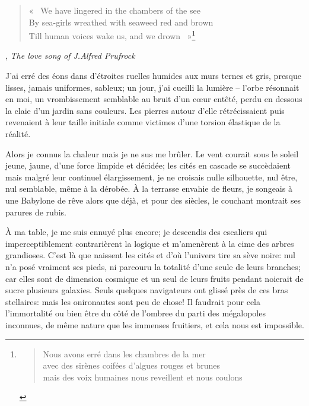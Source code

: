   \begin{quote}
    «~
    We have lingered in the chambers of the see\\
    By sea-girls wreathed with seaweed red and brown\\
    Till human voices wake us, and we drown
    ~»\footnote{
    \begin{verse}
    Nous avons erré dans les chambres de la mer\\
    avec des sirènes coifées d’algues rouges et brunes\\
    mais des voix humaines nous reveillent et nous coulons
  \end{verse}
    }
  \end{quote}
  \begin{flushright}
    , \emph{The love song of J.Alfred Prufrock}
  \end{flushright}

  J’ai erré des éons dans d’étroites  ruelles humides aux murs ternes et
  gris, presque lisses,  jamais uniformes, sableux; un jour,  j’ai cueilli la
  lumière -- l’orbe  résonnait en moi, un vrombissement  semblable au bruit
  d’un cœur entêté, perdu en dessous la claie d’un jardin sans couleurs.
  Les pierres autour  d’elle rétrécissaient puis revenaient  à leur taille
  initiale comme victimes d’une torsion élastique de la réalité.

  Alors je connus la chaleur mais je ne sus me brûler. Le vent courait sous le
  soleil  jeune, jaune,  d’une  force  limpide et  décidée;  les cités  en
  cascade se  succèdaient mais  malgré leur  continuel élargissement,  je ne
  croisais nulle silhouette,  nul être, nul semblable, même  à la dérobée.
  À la terrasse envahie de fleurs, je  songeais à une Babylone de rêve alors
  que déjà, et pour des siècles, le couchant montrait ses parures de rubis.

  À ma table, je  me suis ennuyé plus encore; je  descendis des escaliers qui
  imperceptiblement  contrarièrent la  logique  et m’amenèrent  à la  cime
  des  arbres  grandioses. C’est  là  que  naissent  les cités  et  d’où
  l’univers  tire sa  sève noire:  nul n’a  posé vraiment  ses pieds,  ni
  parcouru la  totalité d’une  seule de  leurs branches;  car elles  sont de
  dimension  cosmique et  un seul  de leurs  fruits pendant  noierait de  sucre
  plusieurs galaxies. Seuls quelques navigateurs  ont glissé près de ces bras
  stellaires: mais  les onironautes sont  peu de  chose! Il faudrait  pour cela
  l’immortalité  ou  bien  être  du  côté  de  l’ombree  du  parti  des
  mégalopoles inconnues, de  même nature que les immenses  fruitiers, et cela
  nous est impossible.

